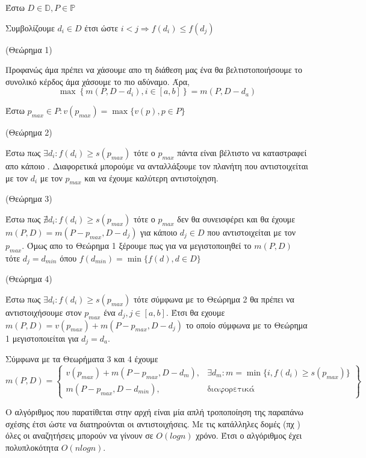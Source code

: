 \hfill

\begin{center}
    Έστω $D \in \mathbb{D}, P \in \mathbb{P}$

    Συμβολίζουμε $d_i \in D$ έτσι ώστε $ i < j \Rightarrow f(d_i) \le f(d_j) $

\hfill

    (Θεώρημα 1)

    Προφανώς άμα πρέπει να χάσουμε απο τη διάθεση μας ένα  θα βελτιστοποιήσουμε
    το συνολικό κέρδος άμα χάσουμε το πιο αδύναμο. Άρα, 
    \begin{equation*}\max\left\{m(P, D-d_i), i \in [a, b]\right\} = m(P, D-d_a)\end{equation*}


\newpage

    Έστω $p_{max} \in P :  v(p_{max}) = \max\{v(p), p \in P\}$

\hfill

    (Θεώρημα 2)

    Έστω πως $\exists d_i : f(d_i) \ge s(p_{max})$ τότε ο $p_{max}$ πάντα είναι βέλτιστο να καταστραφεί απο κάποιο
    . Διαφορετικά μπορούμε να ανταλλάξουμε τον πλανήτη που αντιστοιχείται με τον $d_i$ με τον $p_{max}$ και
    να έχουμε καλύτερη αντιστοίχηση.

\hfill

    (Θεώρημα 3)

    Έστω πως $ \nexists d_i : f(d_i) \ge s(p_{max})$ τότε ο $p_{max}$ δεν θα συνεισφέρει και θα έχουμε $m(P, D) = m(P-p_{max}, D-d_j)$ για κάποιο $d_j \in D$ που αντιστοιχείται με τον $p_{max}$.
    Όμως απο το Θεώρημα 1 ξέρουμε πως για να μεγιστοποιηθεί το $m(P,D)$ τότε $d_j = d_{min}$ όπου $f(d_{min}) = \min\{f(d), d \in D\}$

\hfill

    (Θεώρημα 4)

    Έστω πως $\exists d_i : f(d_i) \ge s(p_{max})$ τότε σύμφωνα με το Θεώρημα 2 θα πρέπει να αντιστοιχήσουμε στον $p_{max}$ ένα  $d_j, j \in [a,b]$.
    Έτσι θα εχουμε $m(P,D) = v(p_{max}) + m(P-p_{max}, D-d_j)$ το οποίο σύμφωνα με το Θεώρημα 1 μεγιστοποιείται για $d_j = d_a$.

Σύμφωνα με τα Θεωρήματα 3 και 4 έχουμε
    \begin{equation*}
        m(P,D) = \left \{
        \begin{array}{lr}
            v(p_{max}) + m(P-p_{max}, D-d_m), & \exists d_m : m = \min\{i, f(d_i) \ge s(p_{max})\} \\
            m(P-p_{max}, D-d_{min}), & \text{διαφορετικά} 
        \end{array}
        \right \} 
    \end{equation*}

Ο αλγόριθμος που παρατίθεται στην αρχή είναι μία απλή τροποποίηση της παραπάνω σχέσης έτσι ώστε να διατηρούνται οι αντιστοιχήσεις.
Με τις κατάλληλες δομές (πχ ) όλες οι αναζητήσεις μπορούν
να γίνουν σε $O(logn)$ χρόνο. Έτσι ο αλγόριθμος έχει πολυπλοκότητα $O(nlogn)$.
\end{center}

